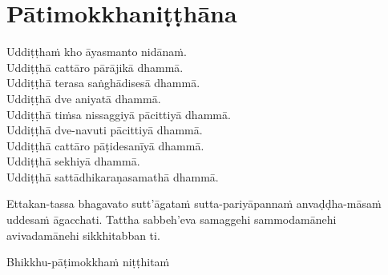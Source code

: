 \section{Pātimokkhaniṭṭhāna}
\label{patimokkhanitthana}

Uddiṭṭhaṁ kho āyasmanto nidānaṁ.\\
Uddiṭṭhā cattāro pārājikā dhammā.\\
Uddiṭṭhā terasa saṅghādisesā dhammā.\\
Uddiṭṭhā dve aniyatā dhammā.\\
Uddiṭṭhā tiṁsa nissaggiyā pācittiyā dhammā.\\
Uddiṭṭhā dve-navuti pācittiyā dhammā.\\
Uddiṭṭhā cattāro pāṭidesanīyā dhammā.\\
Uddiṭṭhā sekhiyā dhammā.\\
Uddiṭṭhā sattādhikaraṇasamathā dhammā.

Ettakan-tassa bhagavato sutt’āgataṁ sutta-pariyāpannaṁ anvaḍḍha-māsaṁ uddesaṁ āgacchati. Tattha sabbeh’eva samaggehi sammodamānehi avivadamānehi sikkhitabban ti.

\begin{outro}
  Bhikkhu-pāṭimokkhaṁ niṭṭhitaṁ
\end{outro}

\clearpage
